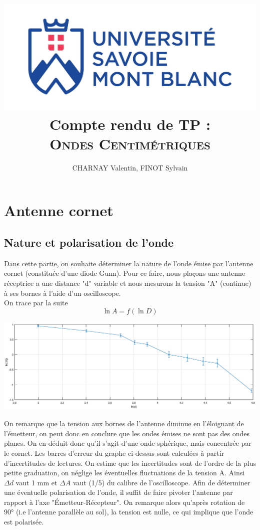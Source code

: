 \documentclass[12pt,a4paper]{article}
\author{CHARNAY Valentin, FINOT Sylvain}
\title{\includegraphics[scale=0.3]{logousmb}\\
Compte rendu de TP : \\ \scshape Ondes Centimétriques}
\begin{document}
	\maketitle
	\section{Antenne cornet}
	\subsection{Nature et polarisation de l'onde}
	Dans cette partie, on souhaite déterminer la nature de l'onde émise par l'antenne cornet (constituée d'une diode Gunn). Pour ce faire, nous plaçons une antenne réceptrice a une distance "d" variable et nous mesurons la tension "A" (continue) à ses bornes à l'aide d'un oscilloscope.\\
	On trace par la suite
	$$\ln A = f(\ln D)$$
	\begin{bigcenter}
		\includegraphics[scale=0.5]{matlab/lnA}
	\end{bigcenter}
	On remarque que la tension aux bornes de l'antenne diminue en l'éloignant de l'émetteur, on peut donc en conclure que les ondes émises ne sont pas des ondes planes. On en déduit donc qu'il s'agit d'une onde sphérique, mais concentrée par le cornet. Les barres d'erreur du graphe ci-dessus sont calculées à partir d'incertitudes de lectures. On estime que les incertitudes sont de l'ordre de la plus petite graduation, on néglige les éventuelles fluctuations de la tension A. Ainsi $\Delta d$ vaut 1 mm et $\Delta A$ vaut (1/5) du calibre de l'oscilloscope.
	Afin de déterminer une éventuelle polarisation de l'onde, il suffit de faire pivoter l'antenne par rapport à l'axe "Émetteur-Récepteur". On remarque alors qu'après rotation de 90° (i.e l'antenne parallèle au sol), la tension est nulle, ce qui implique que l'onde est polarisée.
\end{document}
